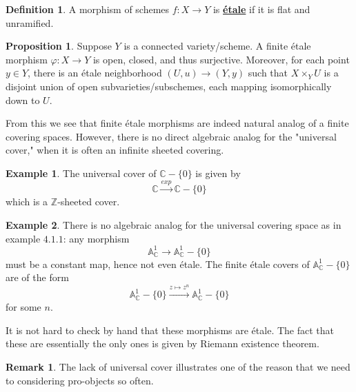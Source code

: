 \documentclass{article}
\theoremstyle{definition}
\theoremstyle{definition}
\newtheorem{definition}{Definition}[theorem]
\theoremstyle{definition}
\newtheorem{remark}{Remark}[theorem]
\theoremstyle{definition}
\newtheorem{proposition}{Proposition}[theorem]
\theoremstyle{definition}
\theoremstyle{definition}
\theoremstyle{definition}
\newtheorem{example}{Example}[theorem]
\begin{document}
\begin{tcolorbox}[colback=purple!5!white,colframe=purple!75!black]
\begin{definition}
A morphism of schemes $f: X\to Y$ is \underline{\textbf{\'etale}} if it is flat and unramified.
\end{definition}
\end{tcolorbox}


\begin{tcolorbox}[colback=blue!5!white,colframe=blue!30!white]
\begin{proposition}
Suppose $Y$ is a connected variety/scheme. A finite \'etale morphism $\varphi: X\to Y$ is open, closed, and thus surjective. Moreover, for each point $y\in Y$, there is an \'etale neighborhood $(U,u)\to (Y,y)$ such that $X\times_Y U$ is a disjoint union of open subvarieties/subschemes, each mapping isomorphically down to $U$.
\end{proposition}
\end{tcolorbox}
From this we see that finite \'etale morphisms are indeed natural analog of a finite covering spaces. However, there is no direct algebraic analog for the "universal cover," when it is often an infinite sheeted covering.
\begin{tcolorbox}[colback=yellow!5!white,colframe=yellow!30!white]
\begin{example}
The universal cover of $\mathbb{C}-\{0\}$ is given by 
\[\mathbb{C}\xrightarrow{exp} \mathbb{C}-\{0\}\]
which is a $\mathbb{Z}$-sheeted cover.  
\end{example}
\end{tcolorbox}


\begin{tcolorbox}[colback=yellow!5!white,colframe=yellow!30!white]
\begin{example}
There is no algebraic analog for the universal covering space as in example $4.1.1$: any morphism 
\[\mathbb{A}^1_{\mathbb{C}}\to \mathbb{A}^1_{\mathbb{C}}-\{0\}\]
must be a constant map, hence not even \'etale. The finite \'etale covers of $\mathbb{A}^1_{\mathbb{C}}-\{0\}$ are of the form 
\[\mathbb{A}^1_{\mathbb{C}}-\{0\}\xrightarrow{z\mapsto z^n}\mathbb{A}^1_{\mathbb{C}}-\{0\}\]
for some $n$. 
\end{example}
\end{tcolorbox}
It is not hard to check by hand that these morphisms are \'etale. The fact that these are essentially the only ones is given by Riemann existence theorem.

\begin{tcolorbox}[colback=green!5!white,colframe=green!30!white]
\begin{remark}
The lack of universal cover illustrates one of the reason that we need to considering pro-objects so often.
\end{remark}
\end{tcolorbox}
\end{document}
